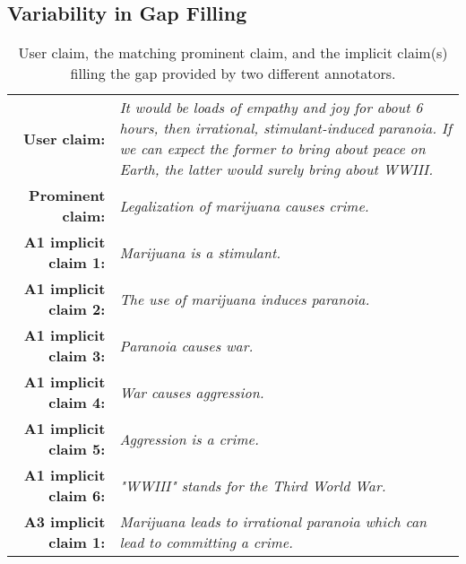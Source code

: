 \subsection{Variability in Gap Filling} 

\begin{table}[t!]
{\small
\begin{tabular}{@{\ }r@{\ \  }p{}}
\toprule
\textbf{User claim:} & \emph{It would be loads of empathy and joy for about 6
hours, then irrational, stimulant-induced paranoia. If we can expect the former
to bring about peace on Earth, the latter would surely bring about WWIII.}\\
\textbf{Prominent claim:} & \emph{Legalization of marijuana causes crime.}\\
\midrule
\textbf{A1 implicit claim 1:} & \emph{Marijuana is a stimulant.}\\
\textbf{A1 implicit claim 2:} & \emph{The use of marijuana induces paranoia.}\\
\textbf{A1 implicit claim 3:} & \emph{Paranoia causes war.}\\
\textbf{A1 implicit claim 4:} & \emph{War causes aggression.}\\
\textbf{A1 implicit claim 5:} & \emph{Aggression is a crime.}\\
\textbf{A1 implicit claim 6:} & \emph{"WWIII" stands for the Third World War.}\\
\midrule
\textbf{A3 implicit claim 1:} & \emph{Marijuana leads to irrational paranoia which can lead to committing a crime.} \\
\bottomrule
\end{tabular}}
\caption{User claim, the matching prominent claim, and the implicit claim(s)
filling the gap provided by two different annotators.}
\label{tab:extreme_premisenumber}
\end{table}

